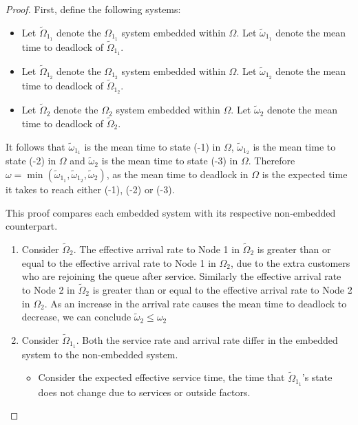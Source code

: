 \documentclass{article}
\numberwithin{equation}{section}
\begin{document}
\begin{proof}
First, define the following systems:
\begin{itemize}
  \item Let $\widetilde{\Omega}_{1_1}$ denote the $\Omega_{1_1}$ system embedded within $\Omega$. Let $\widetilde{\omega}_{1_1}$ denote the mean time to deadlock of $\widetilde{\Omega}_{1_1}$.
  \item Let $\widetilde{\Omega}_{1_2}$ denote the $\Omega_{1_2}$ system embedded within $\Omega$. Let $\widetilde{\omega}_{1_2}$ denote the mean time to deadlock of $\widetilde{\Omega}_{1_2}$.
  \item Let $\widetilde{\Omega}_2$ denote the $\Omega_2$ system embedded within $\Omega$. Let $\widetilde{\omega}_2$ denote the mean time to deadlock of $\widetilde{\Omega}_2$.
\end{itemize}

It follows that $\widetilde{\omega}_{1_1}$ is the mean time to state (-1) in $\Omega$, $\widetilde{\omega}_{1_2}$ is the mean time to state (-2) in $\Omega$ and $\widetilde{\omega}_2$ is the mean time to state (-3) in $\Omega$.
Therefore $\omega = \min(\widetilde{\omega}_{1_1}, \widetilde{\omega}_{1_2}, \widetilde{\omega}_2)$, as the mean time to deadlock in $\Omega$ is the expected time it takes to reach either (-1), (-2) or (-3).

This proof compares each embedded system with its respective non-embedded counterpart.

\begin{enumerate}

\item Consider $\widetilde{\Omega}_2$.
The effective arrival rate to Node 1 in $\widetilde{\Omega}_2$ is greater than or equal to the effective arrival rate to Node 1 in $\Omega_2$, due to the extra customers who are rejoining the queue after service.
Similarly the effective arrival rate to Node 2 in $\widetilde{\Omega}_2$ is greater than or equal to the effective arrival rate to Node 2 in $\Omega_2$.
As an increase in the arrival rate causes the mean time to deadlock to decrease, we can conclude $\widetilde{\omega}_2 \leq \omega_2$

\item Consider $\widetilde{\Omega}_{1_1}$. Both the service rate and arrival rate differ in the embedded system to the non-embedded system.

\begin{itemize}

\item Consider the expected effective service time, the time that $\widetilde{\Omega}_{1_1}$'s state does not change due to services or outside factors.


\end{itemize}
\end{enumerate}
\end{proof}
\end{document}
